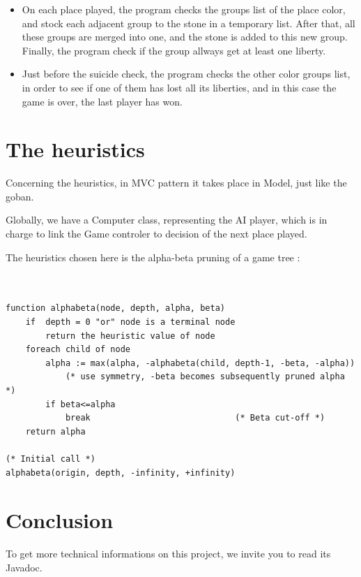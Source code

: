\documentclass[12pt,a4paper,utf8x]{report}
\begin{document}
\begin{onehalfspace}
	\begin{itemize}
		\item On each place played, the program checks the groups list of the place color, and stock each adjacent group to the stone in a temporary list. After that, all these groups are merged into one, and the stone is added to this new group. Finally, the program check if the group allways get at least one liberty.
		\item Just before the suicide check, the program checks the other color groups list, in order to see if one of them has lost all its liberties, and in this case the game is over, the last player has won.
	\end{itemize}

	\clearpage
	
	\chapter{The heuristics}
	
	Concerning the heuristics, in MVC pattern it takes place in Model, just like the goban.
	
	Globally, we have a Computer class, representing the AI player, which is in charge to link the Game controler to decision of the next place played.
	
	The heuristics chosen here is the alpha-beta pruning of a game tree :
	
	\begin{lstlisting}
	
	
function alphabeta(node, depth, alpha, beta)         
    if  depth = 0 "or" node is a terminal node
        return the heuristic value of node
    foreach child of node
        alpha := max(alpha, -alphabeta(child, depth-1, -beta, -alpha))     
      		(* use symmetry, -beta becomes subsequently pruned alpha *)
        if beta<=alpha
            break                             (* Beta cut-off *)
    return alpha

(* Initial call *)
alphabeta(origin, depth, -infinity, +infinity)
	\end{lstlisting}
	
	\clearpage
	
	\chapter{Conclusion}
	
	To get more technical informations on this project, we invite you to read its Javadoc.
	
	\end{onehalfspace}
 
\end{document}
